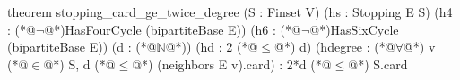 theorem stopping_card_ge_twice_degree (S : Finset V) (hs : Stopping E S)
    (h4 : (*@$\neg$@*)HasFourCycle (bipartiteBase E))
    (h6 : (*@$\neg$@*)HasSixCycle (bipartiteBase E))
    (d : (*@$\mathbb N$@*)) (hd : 2 (*@$\le$@*) d) (hdegree : (*@$\forall$@*) v (*@$\in$@*) S, d (*@$\le$@*) (neighbors E v).card) :
    2*d (*@$\le$@*) S.card
